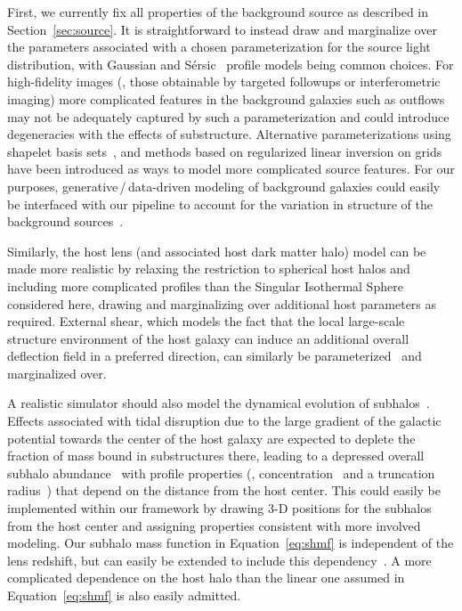 \documentclass[twocolumn]{aastex63}
\begin{document}
First, we currently fix all properties of the background source as described in Section~\ref{sec:source}. It is straightforward to instead draw and marginalize over the parameters associated with a chosen parameterization for the source light distribution, with Gaussian and S\'{e}rsic~\citep{1963BAAA....6...41S} profile models being common choices. For high-fidelity images (\eg, those obtainable by targeted followups or interferometric imaging) more complicated features in the background galaxies such as outflows may not be adequately captured by such a parameterization and could introduce degeneracies with the effects of substructure. Alternative parameterizations using shapelet basis sets~\citep{1504.07629,1505.00198,1803.09746}, and methods based on regularized linear inversion on grids~\citep{2003ApJ...590..673W,astro-ph/0601493,1408.6297,1708.07377} have been introduced as ways to model more complicated source features. For our purposes, generative\,/\,data-driven modeling of background galaxies could easily be interfaced with our pipeline to account for the variation in structure of the background sources~\citep{1901.01359}.

Similarly, the host lens (and associated host dark matter halo) model can be made more realistic by relaxing the restriction to spherical host halos and including more complicated profiles than the Singular Isothermal Sphere considered here, drawing and marginalizing over additional host parameters as required. External shear, which models the fact that the local large-scale structure environment of the host galaxy can induce an additional overall deflection field in a preferred direction, can similarly be parameterized~\citep[\eg,][]{astro-ph/9610163,1997MNRAS.292..673S} and marginalized over.

A realistic simulator should also model the dynamical evolution of subhalos~\citep{2017MNRAS.469.1997D}. Effects associated with tidal disruption due to the large gradient of the galactic potential towards the center of the host galaxy are expected to deplete the fraction of mass bound in substructures there, leading to a depressed overall subhalo abundance~\citep{2016MNRAS.457.1208H} with profile properties (\eg, concentration~\citep{1603.04057} and a truncation radius~\citep{0705.0682}) that depend on the distance from the host center. This could easily be implemented within our framework by drawing 3-D positions for the subhalos from the host center and assigning properties consistent with more involved modeling. Our subhalo mass function in Equation~\eqref{eq:shmf} is independent of the lens redshift, but can easily be extended to include this dependency~\citep{2017MNRAS.469.1997D,2018PhRvD..97l3002H}. A more complicated dependence on the host halo than the linear one assumed in Equation~\eqref{eq:shmf} is also easily admitted.
\end{document}
